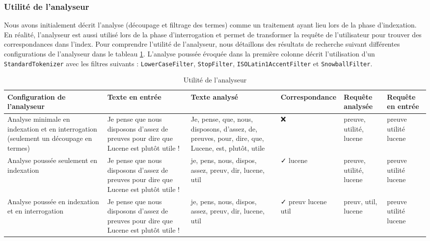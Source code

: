 \subsubsection{Utilité de l'analyseur}

Nous avons initialement décrit l’analyse (découpage et filtrage des termes) comme un traitement ayant lieu lors de la phase d’indexation. En réalité, l’analyseur est aussi utilisé lors de la phase d’interrogation et permet de transformer la requête de l’utilisateur pour trouver des correspondances dans l’index. Pour comprendre l’utilité de l’analyseur, nous détaillons des résultats de recherche suivant différentes configurations de l’analyseur dans le tableau \ref{tab:utilité_analyseur}. L’analyse poussée évoquée dans la première colonne décrit l’utilisation d’un \texttt{StandardTokenizer} avec les filtres suivants : \texttt{LowerCaseFilter}, \texttt{StopFilter}, \texttt{ISOLatin1AccentFilter} et \texttt{SnowballFilter}.

\begin{table}[!htbp]
    \hspace{-3cm}
                \begin{tabular}{|p{3cm}|p{3cm}|p{3cm}|p{3cm}|p{3cm}|p{3cm}|}
                    \hline
                    \textbf{Configuration de l’analyseur} & \textbf{Texte en entrée} & \textbf{Texte analysé} & \textbf{Correspondance} & \textbf{Requête analysée} & \textbf{Requête en entrée}\\
                    \hline                    
Analyse minimale en indexation et en interrogation (seulement un découpage en termes) & Je pense que nous disposons d’assez de preuves pour dire que Lucene est plutôt utile ! & Je, pense, que, nous, disposons, d’assez, de, preuves, pour, dire, que, Lucene, est, plutôt, utile & ❌ & preuve, utilité, lucene & preuve utilité lucene\\
		\hline
Analyse poussée seulement en indexation & Je pense que nous disposons d’assez de preuves pour dire que Lucene est plutôt utile ! & je, pens, nous, dispos, assez, preuv, dir, lucene, util & ✓ lucene & preuve, utilité, lucene & preuve utilité lucene\\
		\hline
Analyse poussée en indexation et en interrogation & Je pense que nous disposons d’assez de preuves pour dire que Lucene est plutôt utile ! & je, pens, nous, dispos, assez, preuv, dir, lucene, util & ✓ preuv lucene util & preuv, util, lucene & preuve utilité lucene\\
                    \hline

                \end{tabular}
                \caption{Utilité de l'analyseur}
                \label{tab:utilité_analyseur}
            \end{table}


